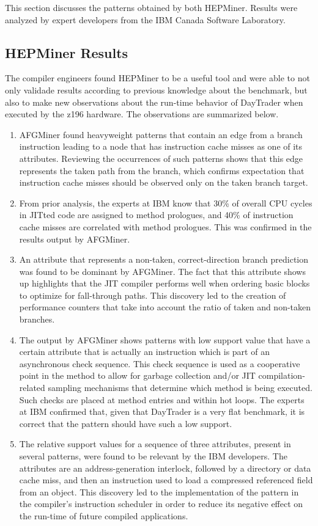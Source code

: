 This section discusses the patterns obtained by both HEPMiner. Results were analyzed by expert developers from the IBM Canada Software Laboratory.
\subsection{HEPMiner Results}
The compiler engineers found HEPMiner to be a useful tool and were able to not only validade results according to previous knowledge about the benchmark, but also to make new observations about the run-time behavior of DayTrader when executed by the z196 hardware. The observations are summarized below.
\begin{enumerate}
\item AFGMiner found heavyweight patterns that contain an edge from a branch instruction leading to a node that has instruction cache misses as one of its attributes. Reviewing the occurrences of such patterns shows that this edge represents the taken path from the branch, which confirms expectation that instruction cache misses should be observed only on the taken branch target.
\item From prior analysis, the experts at IBM know that 30\% of overall CPU cycles in JITted code are assigned to method prologues, and 40\% of instruction cache misses are correlated with method prologues. This was confirmed in the results output by AFGMiner.
\item An attribute that represents a non-taken, correct-direction branch prediction was found to be dominant by AFGMiner. The fact that this attribute shows up highlights that the JIT compiler performs well when ordering basic blocks to optimize for fall-through paths. This discovery led to the creation of performance counters that take into account the ratio of taken and non-taken branches.
\item The output by AFGMiner shows patterns with low support value that have a certain attribute that is actually an instruction which is part of an asynchronous check sequence. This check sequence is used as a cooperative point in the method to allow for garbage collection and/or JIT compilation-related sampling mechanisms that determine which method is being executed. Such checks are placed at method entries and within hot loops. The experts at IBM confirmed that, given that DayTrader is a very flat benchmark, it is correct that the pattern should have such a low support.
\item The relative support values for a sequence of three attributes, present in several patterns, were found to be relevant by the IBM developers. The attributes are an address-generation interlock, followed by a directory or data cache miss, and then an instruction used to load a compressed referenced field from an object. This discovery led to the implementation of the pattern in the compiler's instruction scheduler in order to reduce its negative effect on the run-time of future compiled applications.
\end{enumerate}